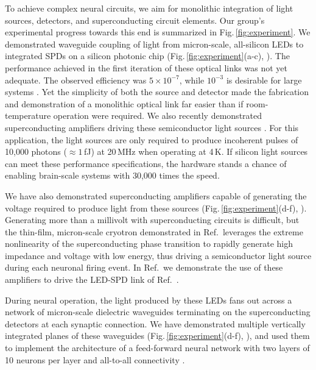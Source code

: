 \documentclass[twocolumn]{article}
\newcommand{\onlinecite}[1]{\hspace{-1 ex} \nocite{#1}\citenum{#1}}
\begin{document}
To achieve complex neural circuits, we aim for monolithic integration of light sources, detectors, and superconducting circuit elements. Our group's experimental progress towards this end is summarized in Fig.\,\ref{fig:experiment}. We demonstrated waveguide coupling of light from micron-scale, all-silicon LEDs to integrated SPDs on a silicon photonic chip (Fig.\,\ref{fig:experiment}(a-c), \cite{buch2017}). The performance achieved in the first iteration of these optical links was not yet adequate. The observed efficiency was $5\times10^{-7}$, while $10^{-3}$ is desirable for large systems \cite{sh2018}. Yet the simplicity of both the source and detector made the fabrication and demonstration of a monolithic optical link far easier than if room-temperature operation were required. We also recently demonstrated superconducting amplifiers driving these semiconductor light sources \cite{mcve2019}. For this application, the light sources are only required to produce incoherent pulses of 10,000 photons ($\approx 1$\,fJ) at 20\,MHz when operating at 4\,K. If silicon light sources can meet these performance specifications, the hardware stands a chance of enabling brain-scale systems with 30,000 times the speed.

We have also demonstrated superconducting amplifiers capable of generating the voltage required to produce light from these sources (Fig.\,\ref{fig:experiment}(d-f), \cite{mcve2019}). Generating more than a millivolt with superconducting circuits is difficult, but the thin-film, micron-scale cryotron demonstrated in Ref.\,\cite{mcve2019} leverages the extreme nonlinearity of the superconducting phase transition to rapidly generate high impedance and voltage with low energy, thus driving a semiconductor light source during each neuronal firing event. In Ref.\,\onlinecite{mcve2019} we demonstrate the use of these amplifiers to drive the LED-SPD link of Ref.\,\onlinecite{buch2017}.

During neural operation, the light produced by these LEDs fans out across a network of micron-scale dielectric waveguides terminating on the superconducting detectors at each synaptic connection. We have demonstrated multiple vertically integrated planes of these waveguides (Fig.\,\ref{fig:experiment}(d-f), \cite{chbu2017}), and used them to implement the architecture of a feed-forward neural network with two layers of 10 neurons per layer and all-to-all connectivity \cite{chbu2018}.
\end{document}
